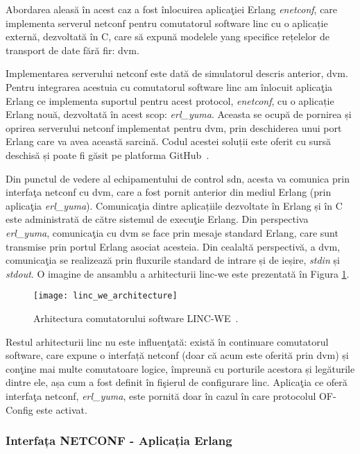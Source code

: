 Abordarea aleasă în acest caz a fost înlocuirea aplicaţiei Erlang \textit{enetconf}, care implementa serverul \gls{netconf} pentru comutatorul software \gls{linc} cu o aplicație externă, dezvoltată în C, care să expună modelele \gls{yang} specifice rețelelor de transport de date fără fir: \gls{dvm}.

Implementarea serverului \gls{netconf} este dată de simulatorul descris anterior, \gls{dvm}. Pentru integrarea acestuia cu comutatorul software \gls{linc} am înlocuit aplicaţia Erlang ce implementa suportul pentru acest protocol, \textit{enetconf}, cu o aplicație Erlang nouă, dezvoltată în acest scop: \textit{erl\_yuma}. Aceasta se ocupă de pornirea și oprirea serverului \gls{netconf} implementat pentru \gls{dvm}, prin deschiderea unui port Erlang care va avea această sarcină. Codul acestei soluții este oferit cu sursă deschisă și poate fi găsit pe platforma GitHub~\cite{lincwe2017}.

Din punctul de vedere al echipamentului de control \gls{sdn}, acesta va comunica prin interfaţa \gls{netconf} cu \gls{dvm}, care a fost pornit anterior din mediul Erlang (prin aplicaţia \textit{erl\_yuma}). Comunicaţia dintre aplicațiile dezvoltate în Erlang și în C este administrată de către sistemul de execuţie Erlang. Din perspectiva \textit{erl\_yuma}, comunicaţia cu \gls{dvm} se face prin mesaje standard Erlang, care sunt transmise prin portul Erlang asociat acesteia. Din cealaltă perspectivă, a \gls{dvm}, comunicaţia se realizează prin fluxurile standard de intrare și de ieșire, \textit{stdin} și \textit{stdout}. O imagine de ansamblu a arhitecturii \gls{linc-we} este prezentată în Figura \ref{fig:linc_we_architecture}.

\begin{figure}[h]
	\centering
	\texttt{[image: linc\_we\_architecture]}
	\caption{Arhitectura comutatorului software LINC-WE~\cite{linc2014qsg}.}
	\label{fig:linc_we_architecture}
\end{figure}

Restul arhitecturii \gls{linc} nu este influenţată: există în continuare comutatorul software, care expune o interfață \gls{netconf} (doar că acum este oferită prin \gls{dvm}) și conţine mai multe comutatoare logice, împreună cu porturile acestora și legăturile dintre ele, așa cum a fost definit în fişierul de configurare \gls{linc}. Aplicaţia ce oferă interfaţa \gls{netconf}, \textit{erl\_yuma}, este pornită doar în cazul în care protocolul OF-Config este activat.

\subsubsection{Interfața NETCONF - Aplicația Erlang}

